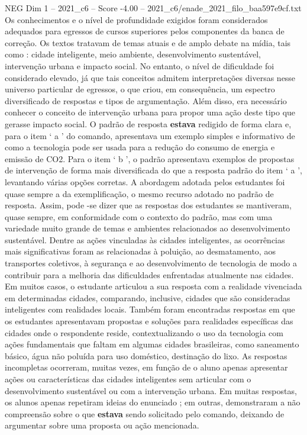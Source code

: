 \begin{textsample}{NEG Dim 1 – 2021\_c6 – Score -4.00 – 2021\_c6/enade\_2021\_filo\_baa597e9cf.txt}
Os conhecimentos e o nível de profundidade exigidos foram considerados adequados para egressos de cursos superiores pelos componentes da banca de correção.
Os textos tratavam de temas atuais e de amplo debate na mídia, tais como : cidade inteligente, meio ambiente, desenvolvimento sustentável, intervenção urbana e impacto social.
No entanto, o nível de dificuldade foi considerado elevado, já que tais conceitos admitem interpretações diversas nesse universo particular de egressos, o que criou, em consequência, um espectro diversificado de respostas e tipos de argumentação.
Além disso, era necessário conhecer o conceito de intervenção urbana para propor uma ação deste tipo que gerasse impacto social.
O padrão de resposta \textbf{estava} redigido de forma clara e, para o item ‘ a ’ do comando, apresentava um exemplo simples e informativo de como a tecnologia pode ser usada para a redução do consumo de energia e emissão de CO2.
Para o item ‘ b ’, o padrão apresentava exemplos de propostas de intervenção de forma mais diversificada do que a resposta padrão do item ‘ a ’, levantando várias opções corretas.
A abordagem adotada pelos estudantes foi quase sempre a da exemplificação, o mesmo recurso adotado no padrão de resposta.
Assim, pode -se dizer que as respostas dos estudantes se mantiveram, quase sempre, em conformidade com o contexto do padrão, mas com uma variedade muito grande de temas e ambientes relacionados ao desenvolvimento sustentável.
Dentre as ações vinculadas às cidades inteligentes, as ocorrências mais significativas foram as relacionadas à poluição, ao desmatamento, aos transportes coletivos, à segurança e ao desenvolvimento de tecnologia de modo a contribuir para a melhoria das dificuldades enfrentadas atualmente nas cidades.
Em muitos casos, o estudante articulou a sua resposta com a realidade vivenciada em determinadas cidades, comparando, inclusive, cidades que são consideradas inteligentes com realidades locais.
Também foram encontradas respostas em que os estudantes apresentavam propostas e soluções para realidades específicas das cidades onde o respondente reside, contextualizando o uso da tecnologia com ações fundamentais que faltam em algumas cidades brasileiras, como saneamento básico, água não poluída para uso doméstico, destinação do lixo.
As respostas incompletas ocorreram, muitas vezes, em função de o aluno apenas apresentar ações ou características das cidades inteligentes sem articular com o desenvolvimento sustentável ou com a intervenção urbana.
Em muitas respostas, os alunos apenas repetiram ideias do enunciado ; em outras, demonstraram a não compreensão sobre o que \textbf{estava} sendo solicitado pelo comando, deixando de argumentar sobre uma proposta ou ação mencionada.

\end{textsample}
